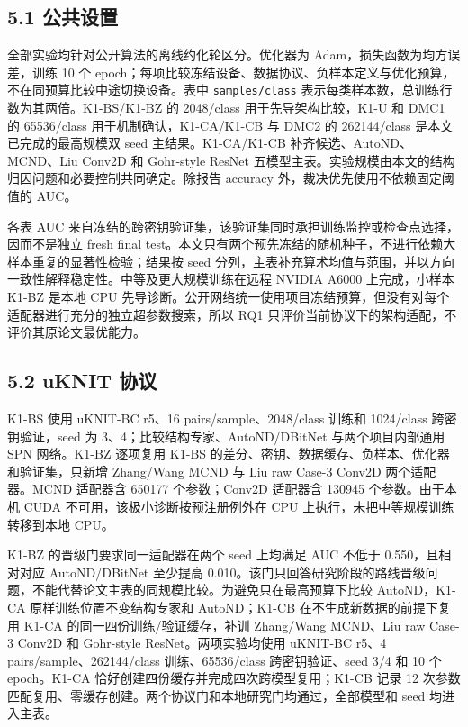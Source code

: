 \documentclass{templates/cjc-utf8}
\begin{document}
\hypertarget{ux516cux5171ux8bbeux7f6e}{%
\subsection{5.1 公共设置}\label{ux516cux5171ux8bbeux7f6e}}

全部实验均针对公开算法的离线约化轮区分。优化器为
Adam，损失函数为均方误差，训练 10 个
epoch；每项比较冻结设备、数据协议、负样本定义与优化预算，不在同预算比较中途切换设备。表中
\texttt{samples/class} 表示每类样本数，总训练行数为其两倍。K1-BS/K1-BZ
的 2048/class 用于先导架构比较，K1-U 和 DMC1 的 65536/class
用于机制确认，K1-CA/K1-CB 与 DMC2 的 262144/class
是本文已完成的最高规模双 seed 主结果。K1-CA/K1-CB
补齐候选、AutoND、MCND、Liu Conv2D 和 Gohr-style ResNet
五模型主表。实验规模由本文的结构归因问题和必要控制共同确定。除报告
accuracy 外，裁决优先使用不依赖固定阈值的 AUC。

各表 AUC
来自冻结的跨密钥验证集，该验证集同时承担训练监控或检查点选择，因而不是独立
fresh final
test。本文只有两个预先冻结的随机种子，不进行依赖大样本重复的显著性检验；结果按
seed
分列，主表补充算术均值与范围，并以方向一致性解释稳定性。中等及更大规模训练在远程
NVIDIA A6000 上完成，小样本 K1-BZ 是本地 CPU
先导诊断。公开网络统一使用项目冻结预算，但没有对每个适配器进行充分的独立超参数搜索，所以
RQ1 只评价当前协议下的架构适配，不评价其原论文最优能力。

\hypertarget{uknit-ux534fux8bae}{%
\subsection{5.2 uKNIT 协议}\label{uknit-ux534fux8bae}}

K1-BS 使用 uKNIT-BC r5、16 pairs/sample、2048/class 训练和 1024/class
跨密钥验证，seed 为 3、4；比较结构专家、AutoND/DBitNet
与两个项目内部通用 SPN 网络。K1-BZ 逐项复用 K1-BS
的差分、密钥、数据缓存、负样本、优化器和验证集，只新增 Zhang/Wang MCND
与 Liu raw Case-3 Conv2D 两个适配器。MCND 适配器含 650177 个参数；Conv2D
适配器含 130945 个参数。由于本机 CUDA 不可用，该极小诊断按预注册例外在
CPU 上执行，未把中等规模训练转移到本地 CPU。

K1-BZ 的晋级门要求同一适配器在两个 seed 上均满足 AUC 不低于
0.550，且相对对应 AutoND/DBitNet 至少提高
0.010。该门只回答研究阶段的路线晋级问题，不能代替论文主表的同规模比较。为避免只在最高预算下比较
AutoND，K1-CA 原样训练位置不变结构专家和 AutoND；K1-CB
在不生成新数据的前提下复用 K1-CA 的同一四份训练/验证缓存，补训
Zhang/Wang MCND、Liu raw Case-3 Conv2D 和 Gohr-style
ResNet。两项实验均使用 uKNIT-BC r5、4 pairs/sample、262144/class
训练、65536/class 跨密钥验证、seed 3/4 和 10 个 epoch。K1-CA
恰好创建四份缓存并完成四次跨模型复用；K1-CB 记录 12
次参数匹配复用、零缓存创建。两个协议门和本地研究门均通过，全部模型和 seed
均进入主表。
\end{document}
